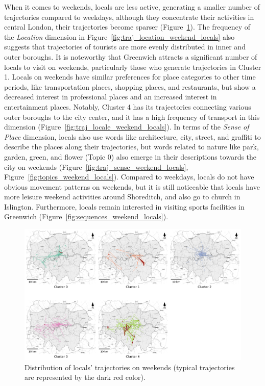 \documentclass{article}
\theoremstyle{remark}
\begin{document}
When it comes to weekends, locals are less active, generating a smaller number of trajectories compared to weekdays, although they concentrate their activities in central London, their trajectories become sparser (Figure~\ref{fig:traj_distribution_weekend_locals}). The frequency of the \textit{Location} dimension in Figure~\ref{fig:traj_location_weekend_locals} also suggests that trajectories of tourists are more evenly distributed in inner and outer boroughs. It is noteworthy that Greenwich attracts a significant number of locals to visit on weekends, particularly those who generate trajectories in Cluster 1. Locals on weekends have similar preferences for place categories to other time periods, like transportation places, shopping places, and restaurants, but show a decreased interest in professional places and an increased interest in entertainment places. Notably, Cluster 4 has its trajectories connecting various outer boroughs to the city center, and it has a high frequency of transport in this dimension (Figure~\ref{fig:traj_locale_weekend_locals}). In terms of the \textit{Sense of Place} dimension, locals also use words like architecture, city, street, and graffiti to describe the places along their trajectories, but words related to nature like park, garden, green, and flower (Topic 0) also emerge in their descriptions towards the city on weekends (Figure~\ref{fig:traj_sense_weekend_locals}, Figure~\ref{fig:topics_weekend_locals}). Compared to weekdays, locals do not have obvious movement patterns on weekends, but it is still noticeable that locals have more leisure weekend activities around Shoreditch, and also go to church in Islington. Furthermore, locals remain interested in visiting sports facilities in Greenwich (Figure~\ref{fig:sequences_weekend_locals}).

\begin{figure}[!h]
\centering
\includegraphics[width=1\textwidth]{figures/traj_distribution_weekend_locals.png}
\caption{\label{fig:traj_distribution_weekend_locals}Distribution of locals' trajectories on weekends (typical trajectories are represented by the dark red color).}
\end{figure}
\end{document}
